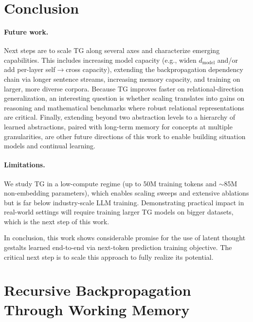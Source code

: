 \documentclass{article}
\begin{document}
\section{Conclusion}

\paragraph{Future work.}
Next steps are to scale TG along several axes and characterize emerging capabilities. This includes increasing model capacity (e.g., widen $d_{\text{model}}$ and/or add per-layer self$\rightarrow$cross capacity), extending the backpropagation dependency chain via longer sentence streams, increasing memory capacity, and training on larger, more diverse corpora. Because TG improves faster on relational-direction generalization, an interesting question is whether scaling translates into gains on reasoning and mathematical benchmarks where robust relational representations are critical. Finally, extending beyond two abstraction levels to a hierarchy of learned abstractions, paired with long-term memory for concepts at multiple granularities, are other future directions of this work to enable building situation models and continual learning.

\paragraph{Limitations.}
We study TG in a low-compute regime (up to 50M training tokens and $\sim$85M non-embedding parameters), which enables scaling sweeps and extensive ablations but is far below industry-scale LLM training. Demonstrating practical impact in real-world settings will require training larger TG models on bigger datasets, which is the next step of this work.

In conclusion, this work shows considerable promise for the use of latent thought gestalts  learned end-to-end via next-token prediction training objective. The critical next step is to scale this approach to fully realize its potential.





\clearpage 


\appendix


\section{Recursive Backpropagation Through Working Memory}
\label{app:grad-chain}
\end{document}
